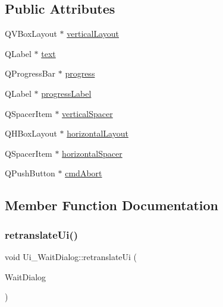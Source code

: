 \subsection*{Public Attributes}
\begin{DoxyCompactItemize}
\item 
Q\+V\+Box\+Layout $\ast$ \mbox{\hyperlink{class_ui___wait_dialog_a78763436b44f901da0804b4ae2ad7c2d}{vertical\+Layout}}
\item 
Q\+Label $\ast$ \mbox{\hyperlink{class_ui___wait_dialog_a1c676997f112c5b550d10b498ae9cb9f}{text}}
\item 
Q\+Progress\+Bar $\ast$ \mbox{\hyperlink{class_ui___wait_dialog_acd3fde41d98cb0e0cdb6252b4be98666}{progress}}
\item 
Q\+Label $\ast$ \mbox{\hyperlink{class_ui___wait_dialog_ad98367f8d10764f285c5cc42bb58bc75}{progress\+Label}}
\item 
Q\+Spacer\+Item $\ast$ \mbox{\hyperlink{class_ui___wait_dialog_a873f28b846c101a22a113ef950e167ee}{vertical\+Spacer}}
\item 
Q\+H\+Box\+Layout $\ast$ \mbox{\hyperlink{class_ui___wait_dialog_a4070a6ce0078fd6ce2a2a903acffd6b5}{horizontal\+Layout}}
\item 
Q\+Spacer\+Item $\ast$ \mbox{\hyperlink{class_ui___wait_dialog_aee72fe3a698611bd9f99c4345e903412}{horizontal\+Spacer}}
\item 
Q\+Push\+Button $\ast$ \mbox{\hyperlink{class_ui___wait_dialog_a32504b078a282dcfe84ba46ad35972a2}{cmd\+Abort}}
\end{DoxyCompactItemize}


\subsection{Member Function Documentation}
\mbox{\label{class_ui___wait_dialog_a617a5df2482de8feec9d8b1fe35ea05a}} 
\subsubsection{\texorpdfstring{retranslateUi()}{retranslateUi()}}
{\footnotesize\ttfamily void Ui\+\_\+\+Wait\+Dialog\+::retranslate\+Ui (\begin{DoxyParamCaption}\item[{Q\+Dialog $\ast$}]{Wait\+Dialog }\end{DoxyParamCaption})\hspace{0.3cm}{\ttfamily [inline]}}

